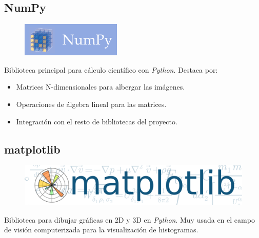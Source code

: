 \subsection{NumPy}
\begin{figure}[H]
  \includegraphics[scale=0.5]{imagenes/logos/numpy_logo.png}
\end{figure}
Biblioteca principal para cálculo científico con
\emph{Python}. Destaca por:
\begin{itemize}
\item Matrices N-dimensionales para albergar las imágenes.
\item Operaciones de álgebra lineal para las matrices.
\item Integración con el resto de bibliotecas del proyecto.
\end{itemize}

\subsection{matplotlib}
\begin{figure}[H]
  \includegraphics[scale=0.2]{imagenes/logos/matplotlib_logo.png}
\end{figure}
Biblioteca para dibujar gráficas en 2D y 3D en \emph{Python}. Muy
usada en el campo de visión computerizada para la visualización de
histogramas.

